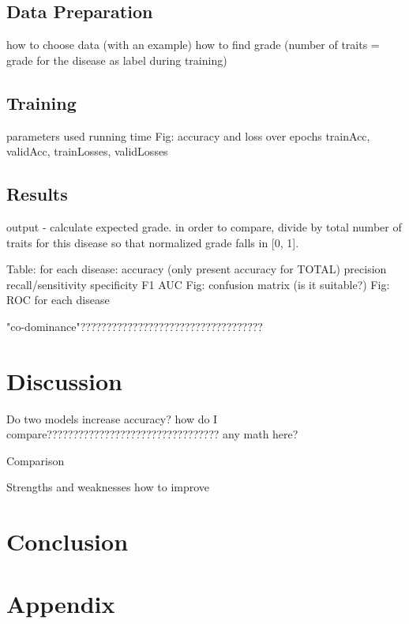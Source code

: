 \documentclass{article}
\begin{document}
		\subsection{Data Preparation}
		
			how to choose data (with an example)
			how to find grade (number of traits = grade for the disease as label during training)
			
		
		\subsection{Training}
			
			parameters used
			running time
			Fig: accuracy and loss over epochs
				trainAcc, validAcc, trainLosses, validLosses
				
				
		\subsection{Results}
			
			output - calculate expected grade. in order to compare, divide by total number of traits for this disease so that normalized grade falls in [0, 1]. 
			
			
			
			Table: for each disease:
				accuracy (only present accuracy for TOTAL)
				precision
				recall/sensitivity
				specificity
				F1
				AUC
			Fig: confusion matrix (is it suitable?)
			Fig: ROC for each disease
	
			"co-dominance"???????????????????????????????????
	
	\section{Discussion}
		
		Do two models increase accuracy?
			how do I compare?????????????????????????????????
			any math here?
		
		Comparison
		
		Strengths and weaknesses
		how to improve
		
	\section{Conclusion}
	
		
	
	\section{Appendix}
	
\end{document}
